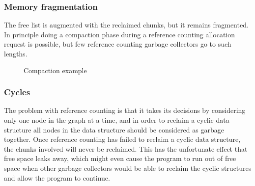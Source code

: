 \documentclass[presentation]{beamer}
\begin{document}
\begin{frame}
  \frametitle{Memory fragmentation} 
  \justifying
The free list is augmented with the reclaimed chunks, but it remains fragmented. In principle
doing a compaction phase during a reference counting allocation request is possible,
but few reference counting garbage collectors go to such lengths.

    \begin{figure}
        \centering
        \caption{Compaction example}
        \label{fig:compaction_example}
    \end{figure}

\end{frame}


\begin{frame}
  \frametitle{Cycles} 
  \justifying
The problem with reference counting is that it takes its decisions by considering
only one node in the graph at a time, and in order to reclaim a cyclic data structure all
nodes in the data structure should be considered as garbage together. Once reference
counting has failed to reclaim a cyclic data structure, the chunks involved will never
be reclaimed. This has the unfortunate effect that free space leaks away, which might
even cause the program to run out of free space when other garbage collectors would
be able to reclaim the cyclic structures and allow the program to continue.
\end{frame}
\end{document}
